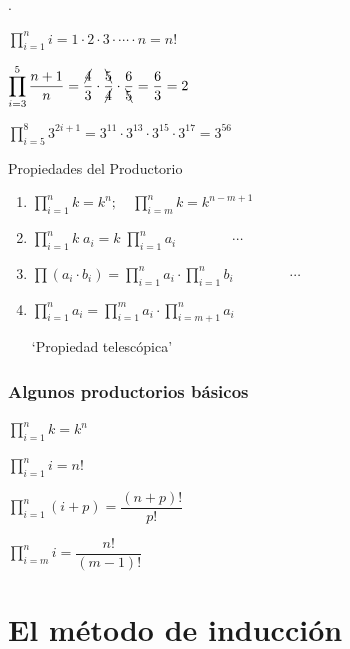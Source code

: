 \vspace{5mm} \begin{ejem}.
	
	$\displaystyle \prod_{i=1}^n i=1\cdot 2 \cdot 3 \cdot \cdots \cdot n = n!$
	
	$\displaystyle \prod_{i=3}^5 \dfrac {n+1}{n} = \dfrac {\cancel{4}}{3} \cdot \dfrac {\bcancel{5}}{\cancel{4}} \cdot \dfrac {6}{\bcancel{5}} =  \dfrac 6 3 = 2 $
	
	$\displaystyle \prod_{i=5}^8 3^{2i+1}=3^{11}\cdot 3^{13}\cdot 3^{15} \cdot 3^{17}=3^{56}$
	
\end{ejem}

\vspace{5mm} \begin{prop}{Propiedades del Productorio}

	\begin{enumerate}
	\item $\displaystyle \prod_{i=1}^n k=k^n; \quad \prod_{i=m}^n k=k^{n-m+1}$
	\item $\displaystyle \prod_{i=1}^n k \; a_i = k\; \prod_{i=1}^n a_i \qquad \qquad \cdots$
	\item $\displaystyle \prod (a_i \cdot b_i)= \prod_{i=1}^n  a_i \cdot \prod_{i=1}^n b_i \qquad \qquad \cdots$
	\item $\displaystyle \prod_{i=1}^n a_i=\prod_{i=1}^m a_i \cdot \prod_{i=m+1}^n a_i$
	
	`Propiedad telescópica'
	
	\end{enumerate}

\end{prop}

\subsection{Algunos productorios básicos}
\begin{multicols}{2}
$\displaystyle \prod_{i=1}^n k =k^n$ 

$\displaystyle \prod_{i=1}^n i =n!$

$\displaystyle \prod_{i=1}^n (i+p) = \dfrac {(n+p)!}{p!}$

$\displaystyle \prod_{i=m}^n i = \dfrac {n!}{(m-1)!}$
\end{multicols}






\chapter{El método de inducción}
\label{inducción}

